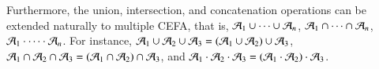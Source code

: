 Furthermore, the union, intersection, and concatenation operations can be extended naturally to multiple CEFA, that is, $\mathcal{A}_1 \cup \cdots \cup \mathcal{A}_n$, $\mathcal{A}_1 \cap \cdots \cap \mathcal{A}_n$, $\mathcal{A}_1 \cdot \cdots \cdot \mathcal{A}_n$. For instance, $\mathcal{A}_1 \cup \mathcal{A}_2 \cup \mathcal{A}_3 = (\mathcal{A}_1 \cup \mathcal{A}_2) \cup \mathcal{A}_3$, $\mathcal{A}_1 \cap \mathcal{A}_2 \cap \mathcal{A}_3 = (\mathcal{A}_1 \cap \mathcal{A}_2) \cap \mathcal{A}_3$, and $\mathcal{A}_1 \cdot \mathcal{A}_2 \cdot \mathcal{A}_3 = (\mathcal{A}_1 \cdot \mathcal{A}_2) \cdot \mathcal{A}_3$.